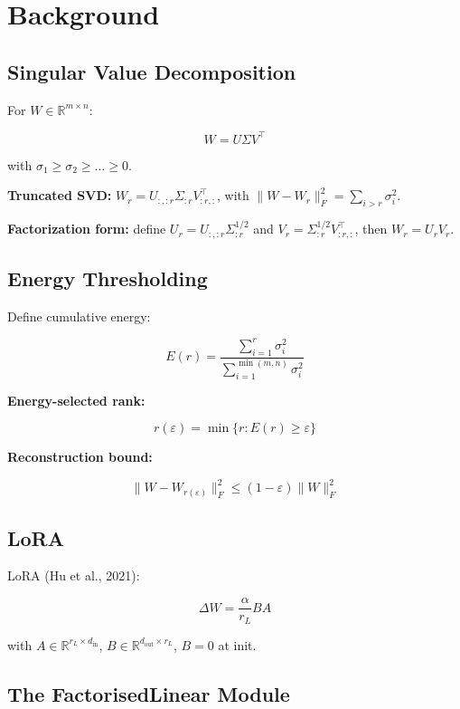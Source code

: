 \section{Background}

\subsection{Singular Value Decomposition}

For $W \in \mathbb{R}^{m \times n}$:

\[
W = U \Sigma V^\top
\tag{3.1}
\]

with $\sigma_1 \geq \sigma_2 \geq \dots \geq 0$.

\textbf{Truncated SVD:} $W_r = U_{:, :r} \Sigma_{:r} V_{:r, :}^\top$, with 
$\|W - W_r\|_F^2 = \sum_{i > r} \sigma_i^2$.

\textbf{Factorization form:} define $U_r = U_{:, :r} \Sigma_{:r}^{1/2}$ and 
$V_r = \Sigma_{:r}^{1/2} V_{:r, :}^\top$, then $W_r = U_r V_r$.

\subsection{Energy Thresholding}

Define cumulative energy:

\[
E(r) = \frac{\sum_{i=1}^r \sigma_i^2}{\sum_{i=1}^{\min(m,n)} \sigma_i^2}
\tag{3.2}
\]

\textbf{Energy-selected rank:}

\[
r(\varepsilon) = \min\{r : E(r) \geq \varepsilon\}
\tag{3.3}
\]

\textbf{Reconstruction bound:}

\[
\|W - W_{r(\varepsilon)}\|_F^2 \leq (1 - \varepsilon) \|W\|_F^2
\tag{3.4}
\]

\subsection{LoRA}

LoRA (Hu et al., 2021):

\[
\Delta W = \frac{\alpha}{r_L} B A
\tag{3.5}
\]

with $A \in \mathbb{R}^{r_L \times d_\text{in}}$, $B \in \mathbb{R}^{d_\text{out} \times r_L}$, $B = 0$ at init.

\subsection{The FactorisedLinear Module}

